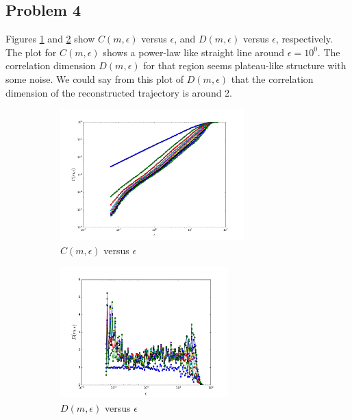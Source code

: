 \documentclass{article}
\begin{document}
\subsection*{Problem 4}
Figures \ref{q4_c} and \ref{q4_d} show $C(m, \epsilon)$ versus $\epsilon$, and $D(m, \epsilon)$ versus $\epsilon$, respectively. The plot for $C(m, \epsilon)$ shows a power-law like straight line around $\epsilon = 10^0$. The correlation dimension $D(m, \epsilon)$ for that region seems plateau-like structure with some noise. We could say from this plot of $D(m, \epsilon)$ that the correlation dimension of the reconstructed trajectory is around 2.


\begin{figure}
\centering
\begin{subfigure}{.5\textwidth}
  \centering
  \includegraphics[height=2in]{figs/q4_c.png}
  \caption{$C(m, \epsilon)$ versus $\epsilon$}
  \label{q4_c}
\end{subfigure}%
\begin{subfigure}{.5\textwidth}
  \centering
  \includegraphics[height=2in]{figs/q4_d.png}
  \caption{$D(m, \epsilon)$ versus $\epsilon$}
  \label{q4_d}
\end{subfigure}
\caption{}
\label{q4}
\end{figure}
\end{document}
